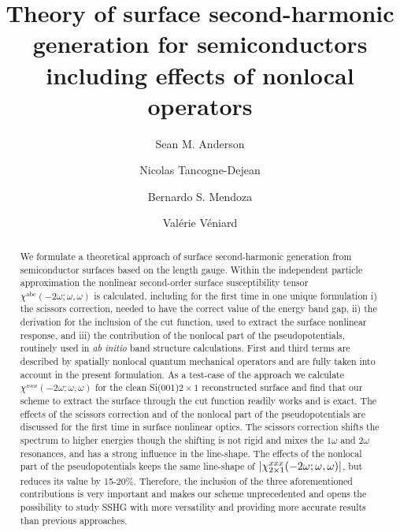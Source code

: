 \documentclass[floatfix,prb,aps,superscriptaddress,showpacs,11pt,preprint,letterpaper]{revtex4}
\begin{document}
\title{Theory of surface second-harmonic generation for semiconductors
including effects of nonlocal operators}
\author{Sean M. Anderson}
\author{Nicolas Tancogne-Dejean}
\author{Bernardo S. Mendoza}
\author{Val\'erie V\'eniard}

\begin{abstract}
We formulate a theoretical approach of surface second-harmonic generation 
from semiconductor surfaces based on the length gauge. 
Within the independent particle approximation 
the nonlinear second-order surface susceptibility tensor
$\chi^{\mathrm{a}\mathrm{b}\mathrm{c}}(-2\omega;\omega,\omega)$   
is calculated, including for the first time in one unique formulation
i) the scissors correction, needed to have the correct value of the
energy band gap,
ii) the derivation for the inclusion of the cut function, 
used to extract the surface nonlinear response,
and iii) the contribution of the nonlocal part of the 
pseudopotentials, routinely  used in \textit{ab initio} band structure calculations. 
First and third terms are described by spatially nonlocal quantum
mechanical operators and are fully taken into account in the present formulation. 
As a test-case of the approach we calculate 
$\chi^{xxx}(-2\omega;\omega,\omega)$ for the clean Si(001)$2\times 1$
reconstructed surface and find that our scheme to extract the surface
through the cut function
readily works and is exact. The effects of the scissors correction and
of the nonlocal part of the pseudopotentials are discussed for the
first time in surface nonlinear optics. 
The scissors correction shifts the spectrum to 
higher energies though the shifting is not rigid and mixes the 
$1\omega$ and $2\omega$ resonances, 
and has a strong influence in the line-shape. 
The 
effects of the nonlocal part of the pseudopotentials 
keeps the same line-shape of $|\chi^{xxx}_{2\times 1}(-2\omega;\omega,\omega)|$, but 
reduces its value
by 15-20\%.  
Therefore, the inclusion of the three aforementioned 
contributions is very important and 
makes our scheme unprecedented and opens the possibility to 
study SSHG with more versatility and providing more accurate results 
than previous approaches. 
\end{abstract}  
\end{document}
